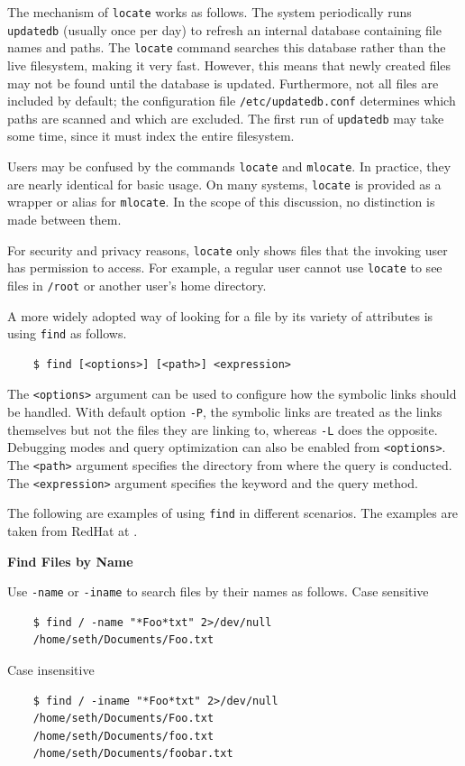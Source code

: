 The mechanism of \verb|locate| works as follows. The system periodically runs \verb|updatedb| (usually once per day) to refresh an internal database containing file names and paths. The \verb|locate| command searches this database rather than the live filesystem, making it very fast. However, this means that newly created files may not be found until the database is updated. Furthermore, not all files are included by default; the configuration file \verb|/etc/updatedb.conf| determines which paths are scanned and which are excluded. The first run of \verb|updatedb| may take some time, since it must index the entire filesystem.

Users may be confused by the commands \verb|locate| and \verb|mlocate|. In practice, they are nearly identical for basic usage. On many systems, \verb|locate| is provided as a wrapper or alias for \verb|mlocate|. In the scope of this discussion, no distinction is made between them.

For security and privacy reasons, \verb|locate| only shows files that the invoking user has permission to access. For example, a regular user cannot use \verb|locate| to see files in \verb|/root| or another user’s home directory.

A more widely adopted way of looking for a file by its variety of attributes is using \verb|find| as follows.
\begin{lstlisting}
	$ find [<options>] [<path>] <expression>
\end{lstlisting}

The \verb|<options>| argument can be used to configure how the symbolic links should be handled. With default option \verb|-P|, the symbolic links are treated as the links themselves but not the files they are linking to, whereas \verb|-L| does the opposite. Debugging modes and query optimization can also be enabled from \verb|<options>|. The \verb|<path>| argument specifies the directory from where the query is conducted. The \verb|<expression>| argument specifies the keyword and the query method.

The following are examples of using \verb|find| in different scenarios. The examples are taken from RedHat at \cite{redhat2022find}.

\vspace{0.1in}
\noindent \textbf{Find Files by Name}
\vspace{0.1in}

Use \verb|-name| or \verb|-iname| to search files by their names as follows. Case sensitive
\begin{lstlisting}
	$ find / -name "*Foo*txt" 2>/dev/null
	/home/seth/Documents/Foo.txt
\end{lstlisting}
Case insensitive
\begin{lstlisting}
	$ find / -iname "*Foo*txt" 2>/dev/null
	/home/seth/Documents/Foo.txt
	/home/seth/Documents/foo.txt
	/home/seth/Documents/foobar.txt
\end{lstlisting}

